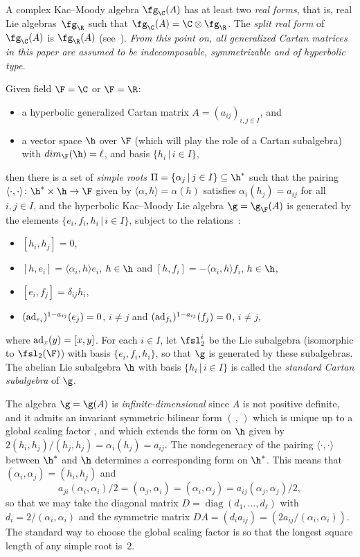A complex Kac--Moody algebra $\fg_\C(A)$ has at least two {\em real forms}, that is, real Lie algebras~$\fg_\R$ such that $\fg_\C(A) = \C\otimes \fg_\R$. The {\em split real form} of $\fg_\C(A)$ is $\fg_\R(A)$ (see~\cite{BBMR95}). {\it From this point on, all generalized Cartan matrices in this paper are assumed to be indecomposable, symmetrizable and of hyperbolic type.}

Given field $\F = \C$ or $\F = \R$:
\begin{itemize}\itemsep=0pt
 \item[--] a hyperbolic generalized Cartan matrix $A=(a_{ij})_{i,j\in I}$, and
 \item[--] a vector space $\h$ over $\F$ (which will play the role of a Cartan subalgebra) with $dim_\F(\h)=\ell$, and basis $\{h_i\, |\, i\in I\}$,
\end{itemize}
then there is a set of {\it simple roots} $\Pi=\{\alpha_j \, |\, j\in I\}\subseteq \h^*$ such that the pairing $\langle\cdot,\cdot\rangle\colon \h^*\times \h\to\F$ given by $\langle\alpha,h\rangle = \alpha(h)$ satisfies $\alpha_i(h_j) = a_{ij}$ for all $i,j\in I$, and
the hyperbolic Kac--Moody Lie algebra $\g=\g_\F(A)$ is generated by the elements $\{e_i, f_i, h_i\, |\, i\in I\}$, subject to the relations~\cite{GabberKac81, Kac90}:
\begin{itemize}\itemsep=0pt
 \item[--] $[h_i, h_j]=0$,
 \item[--] $[h,e_i]=\langle\alpha_i,h\rangle e_i$, $h\in \h$ and $[h,f_i]=-\langle\alpha_i,h\rangle f_i$, $h\in \h$,
 \item[--] $[e_i,f_j]=\delta_{ij}h_i$,
 \item[--] $({\rm ad}_{e_i})^{1-a_{ij}}(e_j)=0$, $i\neq j$ and $({\rm ad}_{f_i})^{1-a_{ij}}(f_j)=0$, $i\neq j$,
\end{itemize}

\noindent where ${\rm ad}_x(y)=[x,y]$. For each $i\in I$, let $\fsl_2^i$ be the Lie subalgebra (isomorphic to $\fsl_2(\F)$) with basis $\{e_i, f_i,h_i\}$, so that $\g$ is generated by these subalgebras. The abelian Lie subalgebra $\h$ with basis $\{h_i\, |\, i\in I\}$ is called the {\it standard Cartan subalgebra} of $\g$.

The algebra $\g=\g(A)$ is {\it infinite-dimensional} since $A$ is not positive definite, and it
admits an invariant symmetric bilinear form $(\hspace{2pt},\hspace{2pt})$ which is unique up to a global scaling factor
\cite[Section~II]{Kac90}, and which extends the form on $\h$ given by $2(h_i,h_j)/(h_j,h_j) = \alpha_i(h_j) = a_{ij}$. The nondegeneracy
of the pairing $\langle\cdot,\cdot\rangle$ between $\h^*$ and $\h$ determines a corresponding form on $\h^*$. This means that
$(\alpha_i,\alpha_j) = (h_i,h_j)$ and
\[a_{ji} (\alpha_i,\alpha_i)/2 = (\alpha_j,\alpha_i) = (\alpha_i,\alpha_j) = a_{ij} (\alpha_j,\alpha_j)/2, \]
so that we may take the diagonal matrix $D = \operatorname{diag}(d_1,\dots,d_\ell)$ with $d_i = 2/(\alpha_i,\alpha_i)$ and the symmetric matrix
$DA = (d_i a_{ij}) = (2 a_{ij}/(\alpha_i,\alpha_i))$. The standard way to choose
the global scaling factor is so that the longest square length of any simple root is~$2$.

